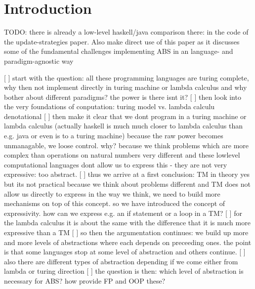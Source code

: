 \section{Introduction}
TODO: there is already a low-level haskell/java comparison there: in the code of the update-strategies paper. Also make direct use of this paper as it discusses some of the fundamental challenges implementing ABS in an language- and paradigm-agnostic way

[ ] start with the question: all these programming languages are turing complete, why then not implement directly in turing machine or lambda calculus and why bother about different paradigms? the power is there isnt it?
[ ] then look into the very foundations of conputation: turing model vs. lambda calculu denotational
[ ] then make it clear that we dont program in a turing machine or lambda calculus (actually haskell is much much closer to lambda calculus than e.g. java or even is to a turing machine) because the raw power becomes unmanagable, we loose control. why? because we think problems which are more complex than operations on natural numbers very different and these lowlevel computational languages dont allow us to express this - they are not very expressive: too abstract.
[ ] thus we arrive at a first conclusion: TM in theory yes but its not practical because we think about problems different and TM does not allow us directly to express in the way we think, we need to build  more mechanisms on top of this concept. so we have introduced the concept of expressivity. how can we express e.g. an if statement or a loop in a TM? 
[ ] for the lambda calculus it is about the same with the difference that it is much more expressive than a TM
[ ] so then the argumentation continues: we build up more and more levels of abstractions where each depends on preceeding ones. the point is that some languages stop at some level of abstraction and others continue.
[ ] also there are different types of abstraction depending if we come either from lambda or turing direction 
[ ] the question is then: which level of abstraction is necessary for ABS? how provide FP and OOP these?